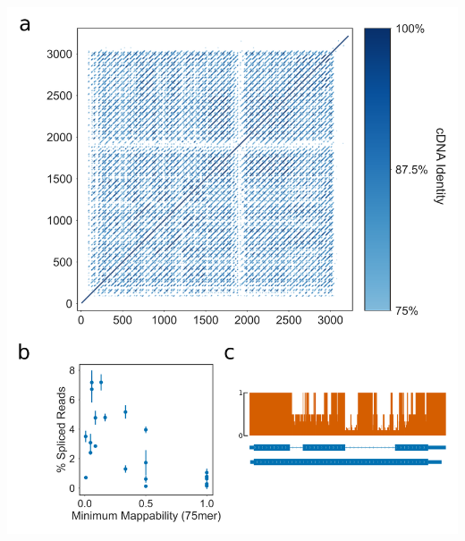 \documentclass[12pt,a4paper,]{report}
\let\origfigure=\figure
\let\endorigfigure=\endfigure
\renewenvironment{figure}[1][2] {
    \expandafter\origfigure\expandafter[H]
} {
    \endorigfigure
}
\begin{document}
\begin{figure}[htbp]
\centering
\includegraphics[width=\textwidth,height=562pt,keepaspectratio]{chapter_6/figures/ext9_dotplot_mappability.png}
\caption[Extensin genes with greater spliced mapped reads have low mappability]{\textbf{Extensin   genes   with   greater   spliced   mapped   reads   have   low   mappability}   \textbf{a)}   Dotplot   showing   self   homology   of   the   EXT9   cDNA   (unspliced   isoform).   Positional   identity   was   calculated   using   15bp   windows   across   the   gene.   Positions   with   identity   less   than   75\%   were   filtered   to   remove   noise   from   the   plot.   \textbf{b)}   Scatter   plot   showing   the   minimum   mappability   score   of   unspliced   Extensin   genes   against   the   percentage   of   spliced   reads   for   that   gene   in   mature   root   RNAseq   samples   (Li   et   al. 2016).   Errorbars   are   standard   deviation   of   three   biological   replicates.   \textbf{c)}   Gene   track   showing   the   mappability   score   across   EXT9   (orange).   Most   splice   forms   cross   these   low   mappability   regions,   including   in   the   reference   annotation   Araport11   (shown   in   blue).   \label{ext_mapp}}
\end{figure}
\end{document}
